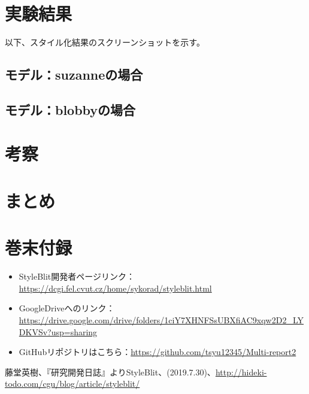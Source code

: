 \documentclass[dvipdfmx]{jsarticle}
\begin{document}
\section{実験結果}
以下、スタイル化結果のスクリーンショットを示す。
\subsection{モデル：suzanneの場合}
\subsection{モデル：blobbyの場合}



\section{考察}
\section{まとめ}


\section{巻末付録}
\begin{itemize}
  \item StyleBlit開発者ページリンク：\url{https://dcgi.fel.cvut.cz/home/sykorad/styleblit.html}
  \item GoogleDriveへのリンク：\url{https://drive.google.com/drive/folders/1ciY7XHNFSsUBXfiAC9xqw2D2_LYDKVSv?usp=sharing}
  \item GitHubリポジトリはこちら：\url{https://github.com/tsyu12345/Multi-report2}
\end{itemize}
\begin{thebibliography}{99}
   藤堂英樹、『研究開発日誌』よりStyleBlit、(2019.7.30)、\url{http://hideki-todo.com/cgu/blog/article/styleblit/}
\end{thebibliography}
\end{document}
